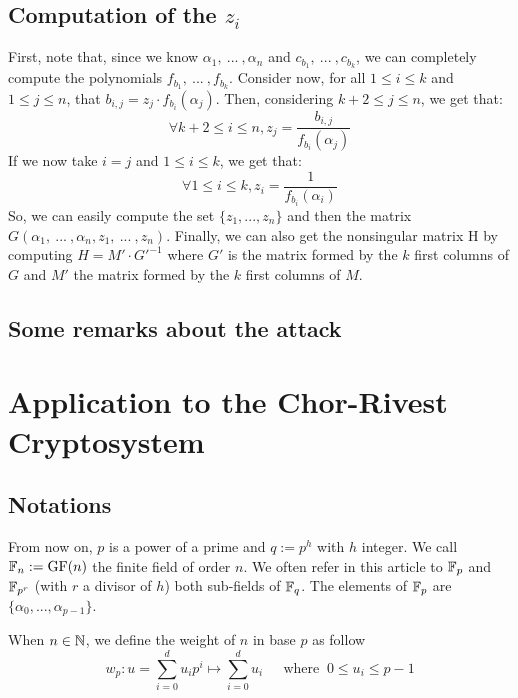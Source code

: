 \documentclass[12pt,a4paper,titlepage]{article}
\begin{document}
\subsection{Computation of the $z_i$}
First, note that, since we know $\alpha_1, \ ... \ , \alpha_n$ and $c_{b_1}, \ ... \ , c_{b_k}$, we can completely compute the polynomials $f_{b_1}, \ ... \ , f_{b_k}$.
Consider now, for all $1\leq i\leq k$ and $1\leq j\leq n$, that $b_{i,j} = z_j\cdot f_{b_i}(\alpha_j)$.
Then, considering $k+2\leq j\leq n$, we get that:
\begin{equation}
 \forall k+2\leq i\leq n, z_j = \frac{b_{i,j}}{f_{b_i}(\alpha_j)}
 \label{eq9}
\end{equation}
If we now take $i=j$ and $1\leq i\leq k$, we get that:
\begin{equation}
 \forall 1\leq i\leq k, z_i = \frac{1}{f_{b_i}(\alpha_i)}
 \label{eq10}
\end{equation}
So, we can easily compute the set $\{z_1,... ,z_n\}$ and then the matrix $G(\alpha_1, \ ... \ ,\alpha_n, z_1, \ ... \ , z_n)$. Finally, we can also get the nonsingular matrix H by computing $H=M'\cdot G'^{-1}$ where
$G'$ is the matrix formed by the $k$ first columns of $G$ and $M'$ the matrix formed by the $k$ first columns of $M$.

\subsection{Some remarks about the attack}

\newpage
\section{Application to the Chor-Rivest Cryptosystem}
\label{sec:CRcrypt}

\subsection{Notations}

From now on, $p$ is a power of a prime and $q := p^h$ with $h$ integer. We call $\mathbb{F}_n := \text{GF}(n)$ the finite field of order $n$. We often refer in this article to $\mathbb{F}_p$ and $\mathbb{F}_{p^r}$ (with $r$ a divisor of $h$) both sub-fields of $\mathbb{F}_q$. The elements of $\mathbb{F}_p$ are $\{ \alpha_0, ... , \alpha_{p-1} \}$.

When $n \in \mathbb{N}$, we define the weight of $n$ in base $p$ as follow
$$ w_p : u = \sum_{i=0}^{d} u_i p^i \longmapsto \sum_{i=0}^{d} u_i \ \ \ \ \ \text{ where }  \ 0 \leq u_i \leq p-1 $$
\end{document}
